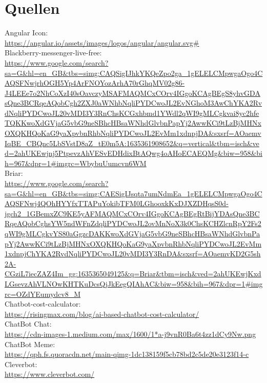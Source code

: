 \section{Quellen}
Angular Icon:\\
\url{https://angular.io/assets/images/logos/angular/angular.svg#}\\

Blackberry-messenger-live-free:\\
\url{https://www.google.com/search?sa=G&hl=en_GB&tbs=simg:CAQSigIJhkYKQeZpo2ga_1gELELCMpwgaOgo4CAQSFNwjrhOGH5Yp4ArFNOYozArhA70rGhqMV02g86-J4LEEe7o2NhCoXzI40sOavczyMSAFMAQMCxCOrv4IGgoKCAgBEgS8yhvGDAsQne3BCRqeAQobCgh2ZXJ0aWNhbNqliPYDCwoJL2EvNGhoM3AwChYKA2RvdNqliPYDCwoJL20vMDI3Y3RnChsKCGxhbmd1YWdl2qWI9gMLCgkvai8yc2hfeTQKKwoXdGVjaG5vbG9neSBhcHBsaWNhdGlvbnPapYj2AwwKCi9tLzBjMHNxOXQKHQoKaG9yaXpvbnRhbNqliPYDCwoJL2EvMm1xdnpjDA&sxsrf=AOaemvIqBE_CBQnc5LbSVstD8aZ_tE0m5A:1635361908652&q=vertical&tbm=isch&ved=2ahUKEwjnj5PtpevzAhVESvEDHdixBtAQwg4oAHoECAEQMg&biw=958&bih=967&dpr=1#imgrc=WbybuUumcvn6WM}\\

Briar:\\
\url{https://www.google.com/search?sa=G&hl=en_GB&tbs=simg:CAESigIJsqta7umNdmEa_1gELELCMpwgaOgo4CAQSFNwj4QOhHYYfxTTAPuYokibTFM0LGhooxkKxDJXZDHqsS0d-jgch2_1GBemxZC9KE5yAFMAQMCxCOrv4IGgoKCAgBEgRtBijYDAsQne3BCRqeAQobCghsYW5ndWFnZdqliPYDCwoJL2ovMnNoX3k0ChsKCHZlcnRpY2Fs2qWI9gMLCgkvYS80aGgzcDAKKwoXdGVjaG5vbG9neSBhcHBsaWNhdGlvbnPapYj2AwwKCi9tLzBjMHNxOXQKHQoKaG9yaXpvbnRhbNqliPYDCwoJL2EvMm1xdnpjChYKA2RvdNqliPYDCwoJL20vMDI3Y3RnDA&sxsrf=AOaemvKD2G5sh2A-CGziL7iecZAZ4Im_gg:1635365049125&q=Briar&tbm=isch&ved=2ahUKEwjKxdLGsevzAhVLNOwKHTKuDcsQjJkEegQIAhAC&biw=958&bih=967&dpr=1#imgrc=OZdYEumydcv8_M}\\

Chatbot-cost-calculator:\\
\url{https://risingmax.com/blog/ai-based-chatbot-cost-calculator/}\\

ChatBot Chat:\\
\url{https://cdn-images-1.medium.com/max/1600/1*a-j9vnR0Ba6t4zz1dCy9Nw.png}\\

ChatBot Meme:\\
\url{https://qph.fs.quoracdn.net/main-qimg-1dc138159f5cb78bd2c5de20e3123f14-c}\\

Cleverbot:\\
\url{https://www.cleverbot.com/}\\

